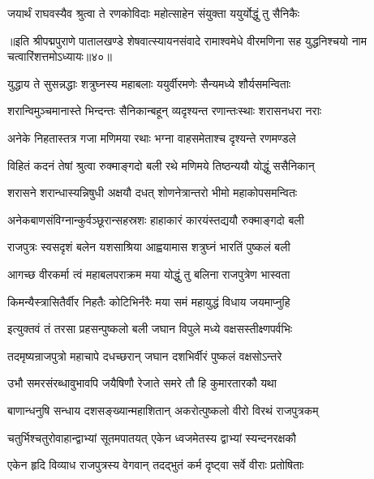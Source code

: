 \twolineshloka
{जयार्थं राघवस्यैव श्रुत्वा ते रणकोविदाः}
{महोत्साहेन संयुक्ता ययुर्योद्धुं तु सैनिकैः}%

{॥इति श्रीपद्मपुराणे पातालखण्डे शेषवात्स्यायनसंवादे रामाश्वमेधे वीरमणिना सह युद्धनिश्चयो नाम चत्वारिंशत्तमोऽध्यायः॥४०॥}



\twolineshloka
{युद्धाय ते सुसन्नद्धाः शत्रुघ्नस्य महाबलाः}
{ययुर्वीरमणेः सैन्यमध्ये शौर्यसमन्विताः}%

\twolineshloka
{शरान्विमुञ्चमानास्ते भिन्दन्तः सैनिकान्बहून्}
{व्यदृश्यन्त रणान्तःस्थाः शरासनधरा नराः}%

\twolineshloka
{अनेके निहतास्तत्र गजा मणिमया रथाः}
{भग्ना वाहसमेताश्च दृश्यन्ते रणमण्डले}%

\twolineshloka
{विहितं कदनं तेषां श्रुत्वा रुक्माङ्गदो बली}
{रथे मणिमये तिष्ठन्ययौ योद्धुं ससैनिकान्}%

\twolineshloka
{शरासने शरान्धास्यन्निषुधी अक्षयौ दधत्}
{शोणनेत्रान्तरो भीमो महाकोपसमन्वितः}%

\twolineshloka
{अनेकबाणसंविग्नान्कुर्वञ्छूरान्सहस्रशः}
{हाहाकारं कारयंस्तद्ययौ रुक्माङ्गदो बली}%

\twolineshloka
{राजपुत्रः स्वसदृशं बलेन यशसाश्रिया}
{आह्वयामास शत्रुघ्नं भारतिं पुष्कलं बली}%


\twolineshloka
{आगच्छ वीरकर्मा त्वं महाबलपराक्रम}
{मया योद्धुं तु बलिना राजपुत्रेण भास्वता}%

\twolineshloka
{किमन्यैस्त्रासितैर्वीर निहतैः कोटिभिर्नरैः}
{मया समं महायुद्धं विधाय जयमाप्नुहि}%

\twolineshloka
{इत्युक्तवं तं तरसा प्रहसन्पुष्कलो बली}
{जघान विपुले मध्ये वक्षसस्तीक्ष्णपर्वभिः}%

\twolineshloka
{तदमृष्यन्राजपुत्रो महाचापे दधच्छरान्}
{जघान दशभिर्वीरं पुष्कलं वक्षसोऽन्तरे}%

\twolineshloka
{उभौ समरसंरब्धावुभावपि जयैषिणौ}
{रेजाते समरे तौ हि कुमारतारकौ यथा}%

\twolineshloka
{बाणान्धनुषि सन्धाय दशसङ्ख्यान्महाशितान्}
{अकरोत्पुष्कलो वीरो विरथं राजपुत्रकम्}%

\twolineshloka
{चतुर्भिश्चतुरोवाहान्द्वाभ्यां सूतमपातयत्}
{एकेन ध्वजमेतस्य द्वाभ्यां स्यन्दनरक्षकौ}%

\twolineshloka
{एकेन हृदि विव्याध राजपुत्रस्य वेगवान्}
{तदद्भुतं कर्म दृष्ट्वा सर्वे वीराः प्रतोषिताः}%

